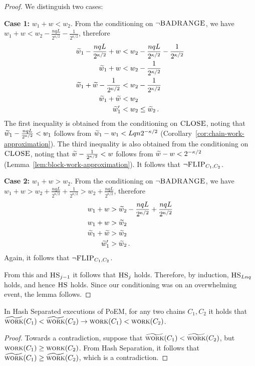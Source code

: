 \begin{proof}
  We distinguish two cases:

  \noindent
  \textbf{Case 1: } $w_1 + w < w_2$.
  From the conditioning on $\lnot \textsc{BADRANGE}$, we have
  $w_1 + w < w_2 - \frac{nqL}{2^{\kappa/2}} - \frac{1}{2^{\kappa/2}}$,
  therefore
  \begin{align*}
    \widetilde{w}_1 - \frac{nqL}{2^{\kappa/2}} + w &< w_2 - \frac{nqL}{2^{\kappa/2}} - \frac{1}{2^{\kappa/2}}\\
    \widetilde{w}_1 + w &< w_2 - \frac{1}{2^{\kappa/2}}\\
    \widetilde{w}_1 + \widetilde{w} - \frac{1}{2^{\kappa/2}} &< w_2 - \frac{1}{2^{\kappa/2}}\\
    \widetilde{w}_1 + \widetilde{w} &< w_2 \\
    \widetilde{w}'_1 &< w_2 \leq \widetilde{w}_2\,.
  \end{align*}
  The first inequality is obtained from the conditioning on $\textsc{CLOSE}$,
  noting that $\widetilde{w}_1 - \frac{nqL}{2^{\kappa/2}} < w_1$ follows from
  $\widetilde{w}_1 - w_1 < Lqn 2^{-\kappa/2}$ (Corollary~\ref{cor:chain-work-approximation}).
  The third inequality is also obtained from the conditioning on $\textsc{CLOSE}$,
  noting that $\widetilde{w} - \frac{1}{2^{\kappa/2}} < w$ follows from
  $\widetilde{w} - w < 2^{-\kappa/2}$ (Lemma~\ref{lem:block-work-approximation}).
  It follows that $\lnot \textsc{FLIP}_{C_1,C_2}$.

  \noindent
  \textbf{Case 2: } $w_1 + w > w_2$.
  From the conditioning on $\lnot \textsc{BADRANGE}$, we have
  $w_1 + w > w_2 + \frac{nqL}{2^{\kappa/2}} + \frac{1}{2^{\kappa/2}} > w_2 + \frac{nqL}{2^{\kappa/2}}$,
  therefore
  \begin{align*}
    w_1 + w &> \widetilde{w}_2 - \frac{nqL}{2^{\kappa/2}} + \frac{nqL}{2^{\kappa/2}}\\
    w_1 + w &> \widetilde{w}_2\\
    \widetilde{w}_1 + \widetilde{w} &> \widetilde{w}_2 \\
    \widetilde{w}'_1 &> \widetilde{w}_2\,.
  \end{align*}
  Again, it follows that $\lnot \textsc{FLIP}_{C_1,C_2}$.

  From this and $\textsc{HS}_{j-1}$ it follows that $\textsc{HS}_j$ holds.
  Therefore, by induction, $\textsc{HS}_{Lnq}$ holds, and hence $\textsc{HS}$ holds.
  Since our conditioning was on an overwhelming event, the lemma follows.
  \Qed
\end{proof}


\begin{corollary}
  In Hash Separated executions of PoEM, for any two chains $C_1, C_2$
  it holds that $\widetilde{\textsc{work}}(C_1) < \widetilde{\textsc{work}}(C_2) \rightarrow \textsc{work}(C_1) < \textsc{work}(C_2)$.
\end{corollary}
\begin{proof}
  Towards a contradiction, suppose that $\widetilde{\textsc{work}}(C_1) < \widetilde{\textsc{work}}(C_2)$, but
  $\textsc{work}(C_1) \geq \textsc{work}(C_2)$. From Hash Separation, it follows that
  $\widetilde{\textsc{work}}(C_1) \geq \widetilde{\textsc{work}}(C_2)$, which is a contradiction.
  \Qed
\end{proof}

